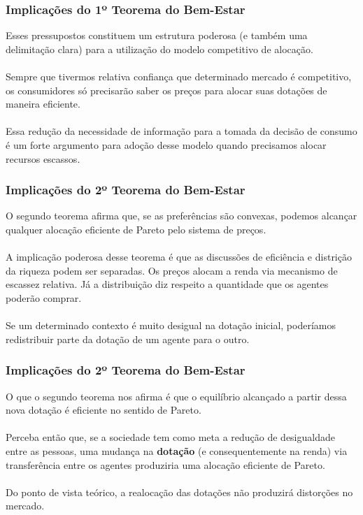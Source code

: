 \documentclass{beamer}[10]
\begin{document}
\begin{frame}
	\frametitle{Implicações do 1º Teorema do Bem-Estar}

	Esses pressupostos constituem um estrutura poderosa (e também uma delimitação clara) para a utilização do modelo competitivo de alocação.
	\\~\\
	Sempre que tivermos relativa confiança que determinado mercado é competitivo, os consumidores só precisarão saber os preços para alocar suas dotações de maneira eficiente.
	\\~\\
	Essa redução da necessidade de informação para a tomada da decisão de consumo é um forte argumento para adoção desse modelo quando precisamos alocar recursos escassos.

\end{frame}

\begin{frame}
	\frametitle{Implicações do 2º Teorema do Bem-Estar}

	O segundo teorema afirma que, se as preferências são convexas, podemos alcançar qualquer alocação eficiente de Pareto pelo sistema de preços.
	\\~\\
	A implicação poderosa desse teorema é que as discussões de eficiência e distrição da riqueza podem ser separadas. Os preços alocam a renda via mecanismo de escassez relativa. Já a distribuição diz respeito a quantidade que os agentes poderão comprar.
	\\~\\
	Se um determinado contexto é muito desigual na dotação inicial, poderíamos redistribuir parte da dotação de um agente para o outro.

\end{frame}

\begin{frame}
	\frametitle{Implicações do 2º Teorema do Bem-Estar}

	O que o segundo teorema nos afirma é que o equilíbrio alcançado a partir dessa nova dotação é eficiente no sentido de Pareto.
	\\~\\
	Perceba então que, se a sociedade tem como meta a redução de desigualdade entre as pessoas, uma mudança na \textbf{dotação} (e consequentemente na renda) via transferência entre os agentes produziria uma alocação eficiente de Pareto.
	\\~\\
	Do ponto  de vista teórico, a realocação das dotações não produzirá distorções no mercado.

\end{frame}
\end{document}
